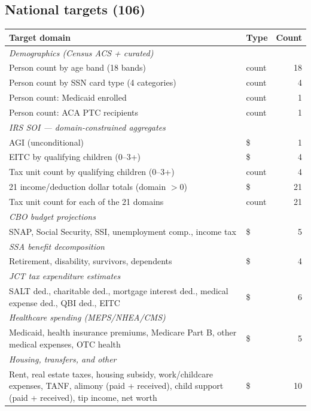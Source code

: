 \subsection{National targets (106)}

\begin{table}[H]
\centering
{\tablefont
\begin{tabular}{p{}lr}
\toprule
Target domain & Type & Count \\
\midrule
\multicolumn{3}{l}{\textit{Demographics (Census ACS + curated)}} \\
Person count by age band (18 bands) & count & 18 \\
Person count by SSN card type (4 categories) & count & 4 \\
Person count: Medicaid enrolled & count & 1 \\
Person count: ACA PTC recipients & count & 1 \\
\midrule
\multicolumn{3}{l}{\textit{IRS SOI --- domain-constrained aggregates}} \\
AGI (unconditional) & \$ & 1 \\
EITC by qualifying children (0--3+) & \$ & 4 \\
Tax unit count by qualifying children (0--3+) & count & 4 \\
21 income/deduction dollar totals (domain $> 0$) & \$ & 21 \\
Tax unit count for each of the 21 domains & count & 21 \\
\midrule
\multicolumn{3}{l}{\textit{CBO budget projections}} \\
SNAP, Social Security, SSI, unemployment comp., income tax & \$ & 5 \\
\midrule
\multicolumn{3}{l}{\textit{SSA benefit decomposition}} \\
Retirement, disability, survivors, dependents & \$ & 4 \\
\midrule
\multicolumn{3}{l}{\textit{JCT tax expenditure estimates}} \\
SALT ded., charitable ded., mortgage interest ded., medical expense ded., QBI ded., EITC & \$ & 6 \\
\midrule
\multicolumn{3}{l}{\textit{Healthcare spending (MEPS/NHEA/CMS)}} \\
Medicaid, health insurance premiums, Medicare Part B, other medical expenses, OTC health & \$ & 5 \\
\midrule
\multicolumn{3}{l}{\textit{Housing, transfers, and other}} \\
Rent, real estate taxes, housing subsidy, work/childcare expenses, TANF, alimony (paid + received), child support (paid + received), tip income, net worth & \$ & 10 \\

\end{tabular}}
\end{table}
